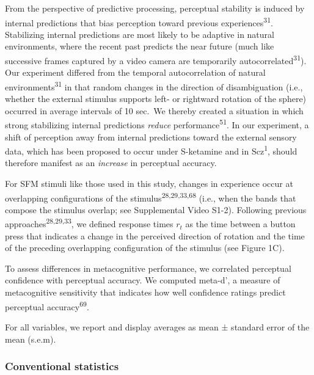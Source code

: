 \documentclass[
]{article}
\begin{document}
From the perspective of predictive processing, perceptual stability is
induced by internal predictions that bias perception toward previous
experiences\textsuperscript{31}. Stabilizing internal predictions are
most likely to be adaptive in natural environments, where the recent
past predicts the near future (much like successive frames captured by a
video camera are temporarily autocorrelated\textsuperscript{31}). Our
experiment differed from the temporal autocorrelation of natural
environments\textsuperscript{31} in that random changes in the direction
of disambiguation (i.e., whether the external stimulus supports left- or
rightward rotation of the sphere) occurred in average intervals of 10
sec.~We thereby created a situation in which strong stabilizing internal
predictions \emph{reduce} performance\textsuperscript{51}. In our
experiment, a shift of perception away from internal predictions toward
the external sensory data, which has been proposed to occur under
S-ketamine and in Scz\textsuperscript{1}, should therefore manifest as
an \emph{increase} in perceptual accuracy.

For SFM stimuli like those used in this study, changes in experience
occur at overlapping configurations of the
stimulus\textsuperscript{28,29,33,68} (i.e., when the bands that compose
the stimulus overlap; see Supplemental Video S1-2). Following previous
approaches\textsuperscript{28,29,33}, we defined response times \(r_t\)
as the time between a button press that indicates a change in the
perceived direction of rotation and the time of the preceding
overlapping configuration of the stimulus (see Figure 1C).

To assess differences in metacognitive performance, we correlated
perceptual confidence with perceptual accuracy. We computed meta-d', a
measure of metacognitive sensitivity that indicates how well confidence
ratings predict perceptual accuracy\textsuperscript{69}.

For all variables, we report and display averages as mean ± standard
error of the mean (s.e.m).

\subsubsection{Conventional statistics}\label{conventional-statistics}
\end{document}
